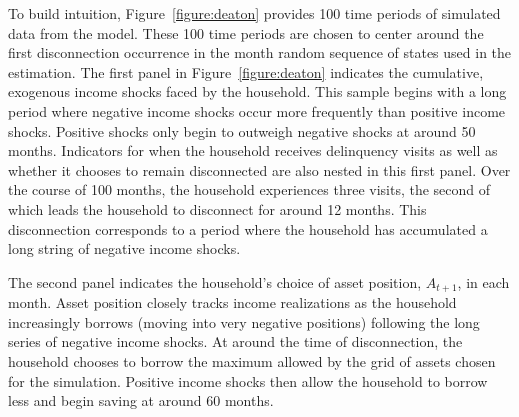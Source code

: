 \documentclass[12pt]{article}
\begin{document}


To build intuition, Figure~\ref{figure:deaton} provides 100 time periods of simulated data from the model.  These 100 time periods are chosen to center around the first disconnection occurrence in the month random sequence of states used in the estimation.  The first panel in Figure~\ref{figure:deaton} indicates the cumulative, exogenous income shocks faced by the household.  This sample begins with a long period where negative income shocks occur more frequently than positive income shocks.  Positive shocks only begin to outweigh negative shocks at around 50 months.  Indicators for when the household receives delinquency visits as well as whether it chooses to remain disconnected are also nested in this first panel.  Over the course of 100 months, the household experiences three visits, the second of which leads the household to disconnect for around 12 months.  This disconnection corresponds to a period where the household has accumulated a long string of negative income shocks.

The second panel indicates the household's choice of asset position, $A_{t+1}$, in each month.  Asset position closely tracks income realizations as the household increasingly borrows (moving into very negative positions) following the long series of negative income shocks.  At around the time of disconnection, the household chooses to borrow the maximum allowed by the grid of assets chosen for the simulation.  Positive income shocks then allow the household to borrow less and begin saving at around 60 months.
\end{document}
